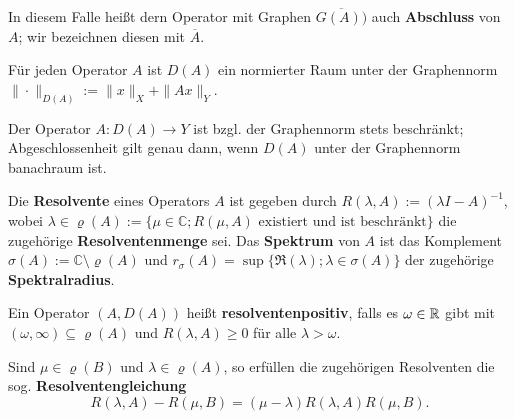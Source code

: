 \par
In diesem Falle heißt dern Operator mit Graphen $\overline{G(A))}$ auch \label{Operator!Abschluss}\textbf{Abschluss} von $A$; wir bezeichnen diesen mit $\overline{A}$.

\par
Für jeden Operator $A$ ist $D(A)$ ein normierter Raum unter der Graphennorm $\|\cdot\|_{D(A)}:=\|x\|_X + \|Ax\|_Y$.

\par
Der Operator  $A\colon D(A)\to Y$ ist bzgl. der Graphennorm stets beschränkt; Abgeschlossenheit gilt genau dann, wenn $D(A)$ unter der Graphennorm banachraum ist. 



 





\par 
Die \textbf{Resolvente} eines Operators $A$ ist gegeben durch $R(\lambda, A):=(\lambda I- A)^{-1}$, wobei $\lambda\in \varrho(A):=\{\mu \in \mathbb C; R(\mu, A)\text{ existiert und ist beschränkt}\}$ die zugehörige \textbf{Resolventenmenge} sei. Das \textbf{Spektrum} von $A$ ist das Komplement $\sigma(A):=\mathbb C\setminus \varrho(A)$ und $r_\sigma(A)=\sup\{\mathfrak R(\lambda); \lambda\in \sigma(A)\}$ der zugehörige \textbf{Spektralradius}. 

\par
Ein Operator $(A, D(A))$ heißt \textbf{resolventenpositiv}, falls es $\omega\in\mathbb{R}$ gibt mit $(\omega, \infty)\subseteq\varrho (A)$ und $R(\lambda, A)\geq0$ für alle $\lambda > \omega$.

\par
Sind $\mu \in\varrho(B)$ und $\lambda\in\varrho(A)$, so erfüllen die zugehörigen Resolventen die sog. \textbf{Resolventengleichung} 
\begin{equation*}
R(\lambda, A)-R(\mu, B)=(\mu-\lambda)R(\lambda, A) R(\mu, B).
\end{equation*}

